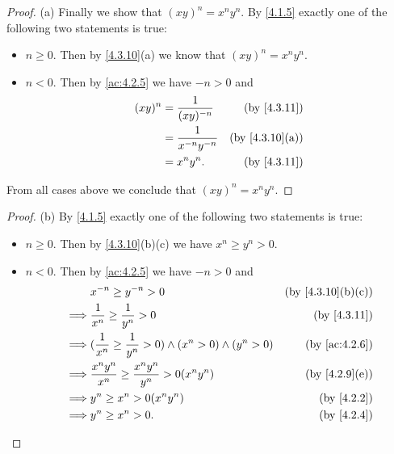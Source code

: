 \begin{proof}{(a)}
  Finally we show that \((xy)^n = x^n y^n\).
  By \cref{4.1.5} exactly one of the following two statements is true:
  \begin{itemize}
    \item \(n \geq 0\).
          Then by \cref{4.3.10}(a) we know that \((xy)^n = x^n y^n\).
    \item \(n < 0\).
          Then by \cref{ac:4.2.5} we have \(-n > 0\) and
          \begin{align*}
            (xy)^n & = \frac{1}{(xy)^{-n}}     & \text{(by \cref{4.3.11})}    \\
                   & = \frac{1}{x^{-n} y^{-n}} & \text{(by \cref{4.3.10}(a))} \\
                   & = x^n y^n.                & \text{(by \cref{4.3.11})}
          \end{align*}
  \end{itemize}
  From all cases above we conclude that \((xy)^n = x^n y^n\).
\end{proof}

\begin{proof}{(b)}
  By \cref{4.1.5} exactly one of the following two statements is true:
  \begin{itemize}
    \item \(n \geq 0\).
          Then by \cref{4.3.10}(b)(c) we have \(x^n \geq y^n > 0\).
    \item \(n < 0\).
          Then by \cref{ac:4.2.5} we have \(-n > 0\) and
          \begin{align*}
                     & x^{-n} \geq y^{-n} > 0                                                 & \text{(by \cref{4.3.10}(b)(c))} \\
            \implies & \frac{1}{x^n} \geq \frac{1}{y^n} > 0                                   & \text{(by \cref{4.3.11})}       \\
            \implies & (\frac{1}{x^n} \geq \frac{1}{y^n} > 0) \land (x^n > 0) \land (y^n > 0) & \text{(by \cref{ac:4.2.6})}     \\
            \implies & \frac{x^n y^n}{x^n} \geq \frac{x^n y^n}{y^n} > 0(x^n y^n)              & \text{(by \cref{4.2.9}(e))}     \\
            \implies & y^n \geq x^n > 0(x^n y^n)                                              & \text{(by \cref{4.2.2})}        \\
            \implies & y^n \geq x^n > 0.                                                      & \text{(by \cref{4.2.4})}
          \end{align*}
  \end{itemize}
\end{proof}

